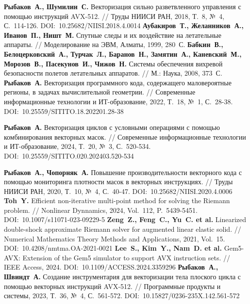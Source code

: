 \begin{thebibliography}{99}
\textbf{Рыбаков~А., Шумилин~С.} Векторизация сильно разветвленного управления с помощью инструкций AVX-512. // Труды НИИСИ РАН, 2018, Т.~8, №~4, С.~114-126. DOI:~10.25682/NIISI.2018.4.0014
\textbf{Аубакиров~Т., Желанников~А., Иванов~П., Ништ~М.} Спутные следы и их воздействие на летательные аппараты. // Моделирование на ЭВМ, Алматы, 1999, 280~С.
\textbf{Бабкин~В., Белоцерковский~А., Турчак~Л., Баранов~Н., Замятин~А., Каневский~М., Морозов~В., Пасекунов~И., Чижов~Н.} Системы обеспечения вихревой безопасности полетов летательных аппаратов. // М.: Наука, 2008, 373~С.
\textbf{Рыбаков~А.} Векторизация программного кода, содержащего маловероятные регионы, в задачах вычислительной геометрии. // Современные информационные технологии и ИТ-образование, 2022, Т.~18, №~1, С.~28-38. DOI:~10.25559/SITITO.18.202201.28-38

\textbf{Рыбаков~А.} Векторизация циклов с условными операциями с помощью комбинирования векторных масок. // Современные информационные технологии и ИТ-образование, 2024, Т.~20, №~3, С.~520-534. DOI:~10.25559/SITITO.020.202403.520-534

\textbf{Рыбаков~А., Чопорняк~А.} Повышение производительности векторного кода с помощью мониторинга плотности масок в векторных инструкциях. // Труды НИИСИ РАН, 2020, Т.~10, №~4, С.~40-47. DOI:~10.25682/NIISI.2020.4.0006
\textbf{Toh~Y.} Efficient non-iterative multi-point method for solving the Riemann problem. // Nonlinear Dynnamics, 2024, Vol.~112, P.~5439-5451. DOI:~10.1007/s11071-023-09229-5
\textbf{Zeng~Z., Feng~C., Yu~C. et al.} Linearized double-shock approximate Riemann solver for augmented linear elastic solid. // Numerical Mathematics Theory Methods and Applications, 2021, Vol.~15. DOI:~10.4208/nmtma.OA-2021-0021
\textbf{Lee~S., Kim~Y., Nam~D. et al.} Gem5-AVX: Extension of the Gem5 simulator to support AVX instruction sets. // IEEE Access, 2024. DOI:~10.1109/ACCESS.2024.3359296
\textbf{Рыбаков~А., Швиндт~А.} Создание инструментария для векторизации тела плоского цикла с помощью векторных инструкций AVX-512. // Программные продукты и системы, 2023, Т.~36, №~4, С.~561-572. DOI:~10.15827/0236-235X.142.561-572




\end{thebibliography}
